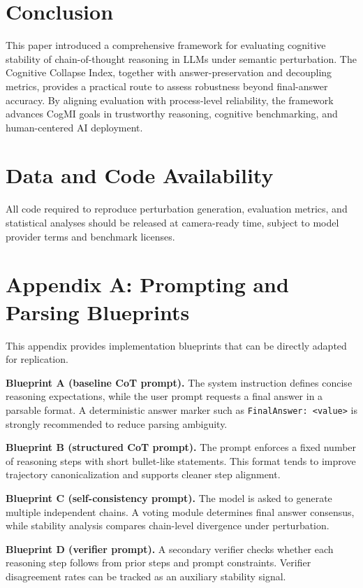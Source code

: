 \documentclass[conference]{IEEEtran}
\begin{document}
\section{Conclusion}
This paper introduced a comprehensive framework for evaluating cognitive stability of chain-of-thought reasoning in LLMs under semantic perturbation. The Cognitive Collapse Index, together with answer-preservation and decoupling metrics, provides a practical route to assess robustness beyond final-answer accuracy. By aligning evaluation with process-level reliability, the framework advances CogMI goals in trustworthy reasoning, cognitive benchmarking, and human-centered AI deployment.

\section*{Data and Code Availability}
All code required to reproduce perturbation generation, evaluation metrics, and statistical analyses should be released at camera-ready time, subject to model provider terms and benchmark licenses.

\section*{Appendix A: Prompting and Parsing Blueprints}
This appendix provides implementation blueprints that can be directly adapted for replication.

\textbf{Blueprint A (baseline CoT prompt).} The system instruction defines concise reasoning expectations, while the user prompt requests a final answer in a parsable format. A deterministic answer marker such as \texttt{FinalAnswer: <value>} is strongly recommended to reduce parsing ambiguity.

\textbf{Blueprint B (structured CoT prompt).} The prompt enforces a fixed number of reasoning steps with short bullet-like statements. This format tends to improve trajectory canonicalization and supports cleaner step alignment.

\textbf{Blueprint C (self-consistency prompt).} The model is asked to generate multiple independent chains. A voting module determines final answer consensus, while stability analysis compares chain-level divergence under perturbation.

\textbf{Blueprint D (verifier prompt).} A secondary verifier checks whether each reasoning step follows from prior steps and prompt constraints. Verifier disagreement rates can be tracked as an auxiliary stability signal.
\end{document}
